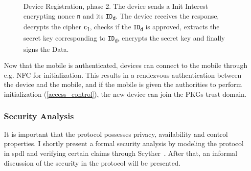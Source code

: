 \begin{figure}[H]
  \caption{Device Registration, phase 2. 
  The device sends a Init Interest encrypting nonce \texttt{n} and its \texttt{ID\textsubscript{d}}.
  The device receives the response, decrypts the cipher \texttt{c\textsubscript{1}}, checks if the \texttt{ID\textsubscript{d}} is approved, extracts the secret key corresponding to \texttt{ID\textsubscript{d}}, encrypts the secret key and finally signs the Data.
  }
  \label{fig:init_ibe_2}
\end{figure}



Now that the mobile is authenticated, devices can connect to the mobile through e.g. \gls{NFC} for initialization.
This results in a rendezvous authentication between the device and the mobile, and if the mobile is given the authorities to perform initialization (\autoref{access_control}), the new device can join the \gls{PKG}s trust domain.

\subsubsection{Security Analysis}
It is important that the protocol possesses privacy, availability and control properties. 
I shortly present a formal security analysis by modeling the protocol in \gls{spdl} and verifying certain claims through Scyther~\cite{DBLP:conf/cav/Cremers08}.
After that, an informal discussion of the security in the protocol will be presented.

